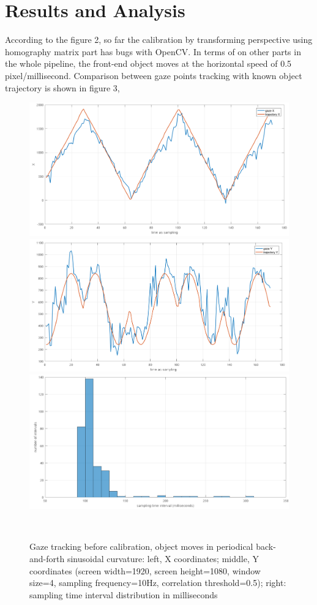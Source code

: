 \documentclass{sigchi}
\begin{document}
\section{Results and Analysis}
According to the figure 2, so far the calibration by transforming perspective using homography matrix part has bugs with OpenCV. In terms of on other parts in the whole pipeline, the front-end object moves at the horizontal speed of 0.5 pixel/millisecond. Comparison between gaze points tracking with known object trajectory is shown in figure 3, 
\begin{figure}[h!]
  \centering
  \includegraphics[width=0.65\columnwidth]{figures/Results_X}\space\space\includegraphics[width=0.66\columnwidth]{figures/Results_Y}\space\space\includegraphics[width=0.64\columnwidth]{figures/sampleFreq}\\
\caption{Gaze tracking before calibration, object moves in periodical back-and-forth sinusoidal curvature: left, X coordinates; middle, Y coordinates (screen width=1920, screen height=1080, window size=4, sampling frequency=10Hz, correlation threshold=0.5); right: sampling time interval distribution in milliseconds}~\label{fig:figure2}
\end{figure}
\end{document}
